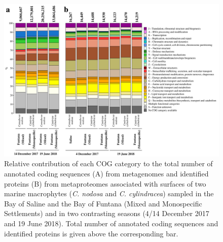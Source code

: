 \documentclass[
  12pt,
]{article}
\begin{document}
\newpage
\begin{figure}[ht]

{\centering \includegraphics[width=1\linewidth]{../results/figures/cog} 

}

\caption{Relative contribution of each COG category to the total number of annotated coding sequences (A) from metagenomes and identified proteins (B) from metaproteomes associated with surfaces of two marine macrophytes (\textit{C. nodosa} and \textit{C. cylindracea}) sampled in the Bay of Saline and the Bay of Funtana (Mixed and Monospecific Settlements) and in two contrasting seasons (4/14 December 2017 and 19 June 2018). Total number of annotated coding sequences and identified proteins is given above the corresponding bar.\label{cog}}\label{fig:unnamed-chunk-5}
\end{figure}
\end{document}

